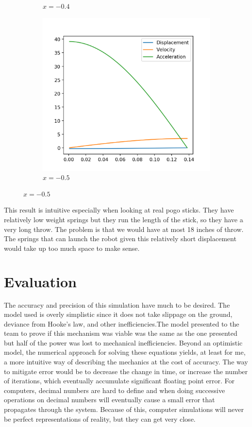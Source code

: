 \documentclass[12pt, letterpaper]{article}
\begin{document}
\begin{figure}[h]
\begin{subfigure}[b]{.3\linewidth}
    \caption{$x=-0.4$}
  \end{subfigure}
  \begin{subfigure}[b]{.3\linewidth}
    \includegraphics[width=\linewidth]{Hooke/hooke9000-0_3.png}
    \caption{$x=-0.5$}
  \end{subfigure}
\end{figure}

This result is intuitive especially when looking at real pogo sticks. They have relatively low weight springs
but they run the length of the stick, so they have a very long throw. The problem is that we would have at
most 18 inches of throw. The springs that can launch the robot given this relatively short displacement would
take up too much space to make sense.

\section{Evaluation}
The accuracy and precision of this simulation have much to be desired. The model used is overly simplistic
since it does not take slippage on the ground, deviance from Hooke's law, and other inefficiencies.The model 
presented to the team to prove if this mechanism was viable was the same as the one presented but half of the
power was lost to mechanical inefficiencies. Beyond an optimistic model, the numerical approach for solving
these equations yields, at least for me, a more intuitive way of describing the mechanics at the cost of
accuracy. The way to mitigate error would be to decrease the change in time, or increase the number of
iterations, which eventually accumulate significant floating point error. For computers, decimal numbers are
hard to define and when doing successive operations on decimal numbers will eventually cause a small error
that propagates through the system. Because of this, computer simulations will never be perfect
representations of reality, but they can get very close.
\end{document}
